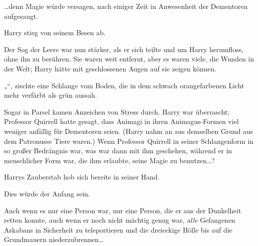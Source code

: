 …denn Magie würde versagen, nach einiger Zeit in Anwesenheit der Dementoren aufgesaugt.

Harry stieg von seinem Besen ab.

Der Sog der Leere war nun stärker, als er sich teilte und um Harry herumfloss, ohne ihn zu berühren. Sie waren weit entfernt, aber es waren viele, die Wunden in der Welt; Harry hätte mit geschlossenen Augen auf sie zeigen können.

„“, zischte eine Schlange vom Boden, die in dem schwach orangefarbenen Licht mehr verfärbt als grün aussah.

Sogar in Parsel kamen Anzeichen von Stress durch. Harry war überrascht; Professor Quirrell hatte gesagt, dass Animagi in ihren Animagus-Formen viel weniger anfällig für Dementoren seien. (Harry nahm an aus demselben Grund aus dem Patronusse Tiere waren.) Wenn Professor Quirrell in seiner Schlangenform in so großer Bedrängnis war, was war dann mit ihm geschehen, während er in menschlicher Form war, die ihm erlaubte, seine Magie zu benutzen…?

Harrys Zauberstab hob sich bereits in seiner Hand.

Dies würde der Anfang sein.

Auch wenn es nur eine Person war, nur eine Person, die er aus der Dunkelheit retten konnte, auch wenn er noch nicht mächtig genug war, \emph{alle} Gefangenen Askabans in Sicherheit zu teleportieren und die dreieckige Hölle bis auf die Grundmauern niederzubrennen…

